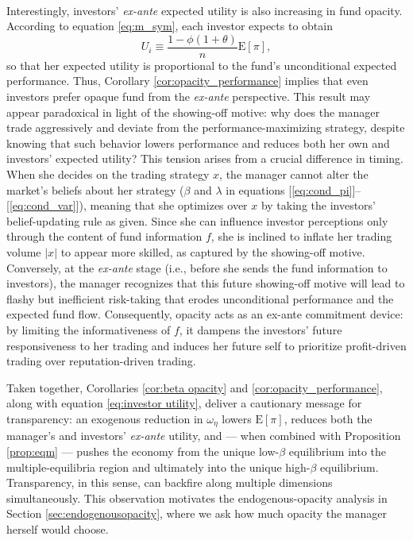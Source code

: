 \paragraph{}
Interestingly, investors' \textit{ex-ante} expected utility is also increasing in fund opacity. According to equation \eqref{eq:m_sym}, each investor expects to obtain
 \begin{equation}
     U_{i} \equiv \frac{1-\phi(1+\theta)}{n}\mathrm{E}[\pi],\label{eq:investor utility}
 \end{equation}
 so that her expected utility is proportional to the fund's unconditional expected performance. Thus, Corollary \ref{cor:opacity_performance} implies that even investors prefer opaque fund from the \textit{ex-ante} perspective. This result may appear paradoxical in light of the showing-off motive: why does the manager trade aggressively and deviate from the performance-maximizing strategy, despite knowing that such behavior lowers performance and reduces both her own and investors' expected utility? This tension arises from a crucial difference in timing. When she decides on the trading strategy $x$, the manager cannot alter the market's beliefs about her strategy ($\beta$ and $\lambda$ in equations [\ref{eq:cond_pi}]--[\ref{eq:cond_var}]), meaning that she optimizes over $x$ by taking the investors' belief-updating rule as given. Since she can influence investor perceptions only through the content of fund information $f$, she is inclined to inflate her trading volume $|x|$ to appear more skilled, as captured by the showing-off motive. Conversely, at the \textit{ex-ante} stage (i.e., before she sends the fund information to investors), the manager recognizes that this future showing-off motive will lead to flashy but inefficient risk-taking that erodes unconditional performance and the expected fund flow. Consequently, opacity acts as an ex-ante commitment device: by limiting the informativeness of $f$, it dampens the investors' future responsiveness to her trading and induces her future self to prioritize profit-driven trading over reputation-driven trading.

Taken together, Corollaries \ref{cor:beta opacity} and \ref{cor:opacity_performance}, along with equation \eqref{eq:investor utility}, deliver a cautionary message for transparency: an exogenous reduction in $\omega_{\eta}$ lowers $\mathrm{E}[\pi]$, reduces both the manager's and investors' \textit{ex-ante} utility, and --- when combined with Proposition \ref{prop:eqm} --- pushes the economy from the unique low-$\beta$ equilibrium into the multiple-equilibria region and ultimately into the unique high-$\beta$ equilibrium. Transparency, in this sense, can backfire along multiple dimensions simultaneously. This observation motivates the endogenous-opacity analysis in Section \ref{sec:endogenousopacity}, where we ask how much opacity the manager herself would choose.

